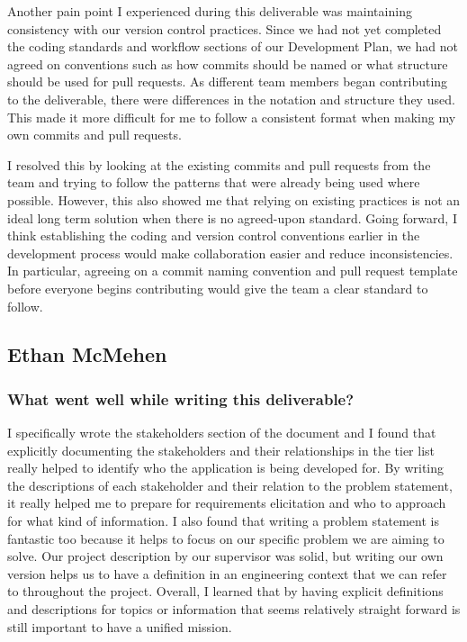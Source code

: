 \documentclass{article}
\begin{document}
Another pain point I experienced during this deliverable was maintaining consistency with our version control practices. Since we had not yet completed the coding 
standards and workflow sections of our Development Plan, we had not agreed on conventions such as how commits should be named or what structure should be used for 
pull requests. As different team members began contributing to the deliverable, there were differences in the notation and structure they used. This made it more 
difficult for me to follow a consistent format when making my own commits and pull requests.

I resolved this by looking at the existing commits and pull requests from the team and trying to follow the patterns that were already being used where possible. 
However, this also showed me that relying on existing practices is not an ideal long term solution when there is no agreed-upon standard. Going forward, I think 
establishing the coding and version control conventions earlier in the development process would make collaboration easier and reduce inconsistencies. In particular, 
agreeing on a commit naming convention and pull request template before everyone begins contributing would give the team a clear standard to follow.

\subsection*{Ethan McMehen}

\subsubsection*{What went well while writing this deliverable?}

I specifically wrote the stakeholders section of the document and I found that 
explicitly documenting the stakeholders and their relationships in the tier list 
really helped to identify who the application is being developed for. By writing 
the descriptions of each stakeholder and their relation to the problem statement, 
it really helped me to prepare for requirements elicitation and who to approach 
for what kind of information. I also found that writing a problem statement is 
fantastic too because it helps to focus on our specific problem we are aiming to 
solve. Our project description by our supervisor was solid, but writing our own 
version helps us to have a definition in an engineering context that we can refer 
to throughout the project. Overall, I learned that by having explicit definitions 
and descriptions for topics or information that seems relatively straight forward 
is still important to have a unified mission.
\end{document}
